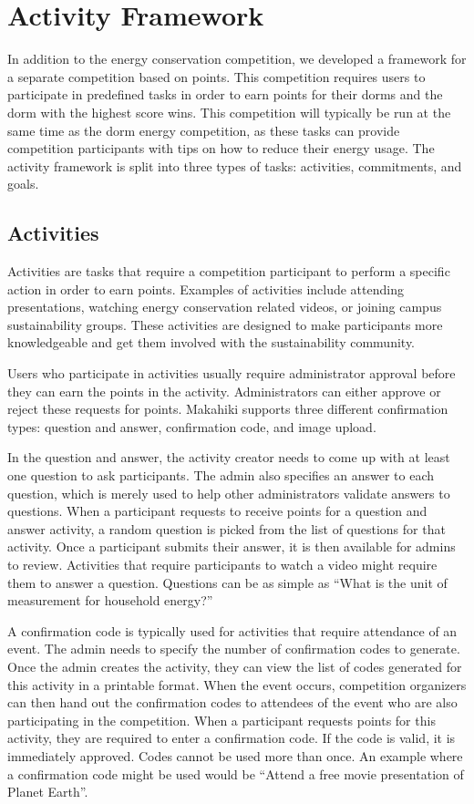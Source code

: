 \section{Activity Framework}
\label{activity}

In addition to the energy conservation competition, we developed a framework for a separate competition based on points.  This competition requires users to participate in predefined tasks in order to earn points for their dorms and the dorm with the highest score wins.  This competition will typically be run at the same time as the dorm energy competition, as these tasks can provide competition participants with tips on how to reduce their energy usage.  The activity framework is split into three types of tasks: activities, commitments, and goals.

\subsection{Activities}

Activities are tasks that require a competition participant to perform a specific action in order to earn points.  Examples of activities include attending presentations, watching energy conservation related videos, or joining campus sustainability groups.  These activities are designed to make participants more knowledgeable and get them involved with the sustainability community.

Users who participate in activities usually require administrator approval before they can earn the points in the activity.  Administrators can either approve or reject these requests for points.  Makahiki supports three different confirmation types: question and answer, confirmation code, and image upload.

In the question and answer, the activity creator needs to come up with at least one question to ask participants.  The admin also specifies an answer to each question, which is merely used to help other administrators validate answers to questions.  When a participant requests to receive points for a question and answer activity, a random question is picked from the list of questions for that activity.  Once a participant submits their answer, it is then available for admins to review.  Activities that require participants to watch a video might require them to answer a question.  Questions can be as simple as ``What is the unit of measurement for household energy?''

A confirmation code is typically used for activities that require attendance of an event.  The admin needs to specify the number of confirmation codes to generate.  Once the admin creates the activity, they can view the list of codes generated for this activity in a printable format.  When the event occurs, competition organizers can then hand out the confirmation codes to attendees of the event who are also participating in the competition.  When a participant requests points for this activity, they are required to enter a confirmation code.  If the code is valid, it is immediately approved.  Codes cannot be used more than once.  An example where a confirmation code might be used would be ``Attend a free movie presentation of Planet Earth''.

